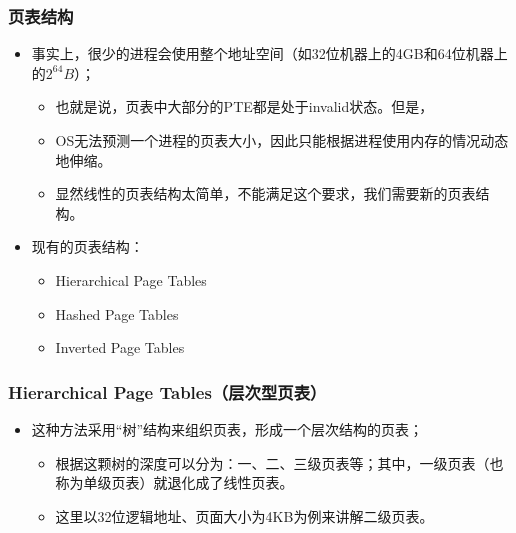 \documentclass[CJKutf8,dvipsnames,table]{beamer}
\begin{document}
\begin{CJK*}{UTF8}{song}
  \begin{frame}
  \frametitle{页表结构} \pause
  \begin{itemize}
  \item 事实上，很少的进程会使用整个地址空间（如32位机器上的4GB和64位机器上的$2^{64}B$）；  \pause
    \begin{itemize}
    \item 也就是说，页表中大部分的PTE都是处于invalid状态。但是，  \pause
    \item OS无法预测一个进程的页表大小，因此只能根据进程使用内存的情况动态地伸缩。  \pause
    \item 显然线性的页表结构太简单，不能满足这个要求，我们需要新的页表结构。  \pause
    \end{itemize}
  \item 现有的页表结构：  \pause
    \begin{itemize}
    \item Hierarchical Page Tables  \pause
    \item Hashed Page Tables  \pause
    \item Inverted Page Tables 
    \end{itemize}
  \end{itemize}
  \end{frame}
  
  \begin{frame}
  \frametitle{Hierarchical Page Tables（层次型页表）} \pause
  \begin{itemize}
  \item 这种方法采用“树”结构来组织页表，形成一个层次结构的页表；  \pause
    \begin{itemize}
    \item 根据这颗树的深度可以分为：一、二、三级页表等；其中，一级页表（也称为单级页表）就退化成了线性页表。  \pause
    \item 这里以32位逻辑地址、页面大小为4KB为例来讲解二级页表。 
    \end{itemize}
  \end{itemize}
  \end{frame}
  

\end{CJK*}
\end{document}

